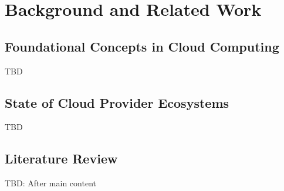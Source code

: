 
\chapter{Background and Related Work} %
\label{chap:Background and Related Work}

\section{Foundational Concepts in Cloud Computing} %
\label{sec:Foundational Concepts in Cloud Computing}

TBD


\section{State of Cloud Provider Ecosystems} %
\label{sec:State of Cloud Provider Ecosystems}

TBD


\section{Literature Review} %
\label{sec:Literature Review}

TBD: After main content





